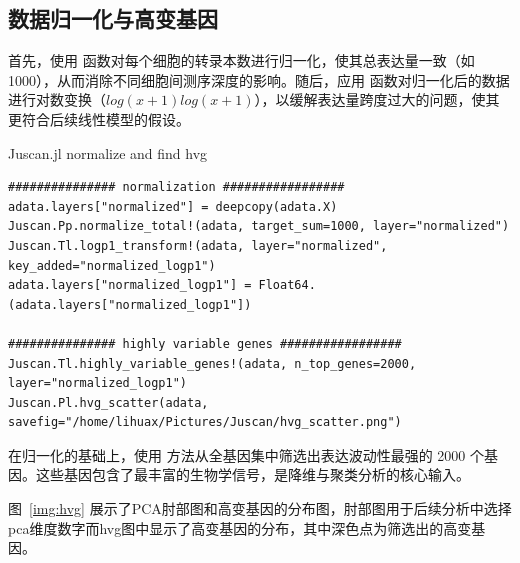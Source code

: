 \subsection{数据归一化与高变基因}

首先，使用  函数对每个细胞的转录本数进行归一化，使其总表达量一致（如 1000），从而消除不同细胞间测序深度的影响。随后，应用  函数对归一化后的数据进行对数变换（$log(x+1)log(x+1)$），以缓解表达量跨度过大的问题，使其更符合后续线性模型的假设。

\begin{fancybox}{Juscan.jl normalize and find hvg}
\begin{lstlisting}
############### normalization #################
adata.layers["normalized"] = deepcopy(adata.X)
Juscan.Pp.normalize_total!(adata, target_sum=1000, layer="normalized")
Juscan.Tl.logp1_transform!(adata, layer="normalized", key_added="normalized_logp1")
adata.layers["normalized_logp1"] = Float64.(adata.layers["normalized_logp1"])

############### highly variable genes #################
Juscan.Tl.highly_variable_genes!(adata, n_top_genes=2000, layer="normalized_logp1")
Juscan.Pl.hvg_scatter(adata, savefig="/home/lihuax/Pictures/Juscan/hvg_scatter.png")
\end{lstlisting}
\end{fancybox}

在归一化的基础上，使用  方法从全基因集中筛选出表达波动性最强的 2000 个基因。这些基因包含了最丰富的生物学信号，是降维与聚类分析的核心输入。

图~\ref{img:hvg} 展示了PCA肘部图和高变基因的分布图，肘部图用于后续分析中选择pca维度数字而hvg图中显示了高变基因的分布，其中深色点为筛选出的高变基因。

